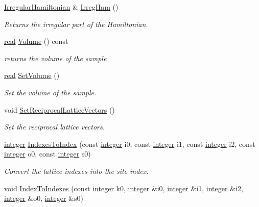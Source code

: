 \begin{DoxyCompactItemize}
\hyperlink{classIrregularHamiltonian}{Irregular\+Hamiltonian} \& \hyperlink{classNumCal_1_1Lattice_a2d7c6553ec30511cb0e17d64beed0424}{Irreg\+Ham} ()
\begin{DoxyCompactList}\small\item\em Returns the irregular part of the Hamiltonian. \end{DoxyCompactList}\item 
\hyperlink{namespaceNumCal_ac10564761316cff6fb75fe8bfccd6def}{real} \hyperlink{classNumCal_1_1Lattice_a8223586b6d642d4436babb7c89f8d424}{Volume} () const 
\begin{DoxyCompactList}\small\item\em returns the volume of the sample \end{DoxyCompactList}\item 
\hyperlink{namespaceNumCal_ac10564761316cff6fb75fe8bfccd6def}{real} \hyperlink{classNumCal_1_1Lattice_a080294bd34727c5e4e536000cc379f01}{Set\+Volume} ()
\begin{DoxyCompactList}\small\item\em Set the volume of the sample. \end{DoxyCompactList}\item 
void \hyperlink{classNumCal_1_1Lattice_aaf21bd2f08683035f260ea4de09b4504}{Set\+Reciprocal\+Lattice\+Vectors} ()
\begin{DoxyCompactList}\small\item\em Set the reciprocal lattice vectors. \end{DoxyCompactList}\item 
\hyperlink{namespaceNumCal_ae1031b42812e871d8f5bd9b7b15fc7d8}{integer} \hyperlink{classNumCal_1_1Lattice_a94dd319f6adc6e820a5696c504216501}{Indexes\+To\+Index} (const \hyperlink{namespaceNumCal_ae1031b42812e871d8f5bd9b7b15fc7d8}{integer} i0, const \hyperlink{namespaceNumCal_ae1031b42812e871d8f5bd9b7b15fc7d8}{integer} i1, const \hyperlink{namespaceNumCal_ae1031b42812e871d8f5bd9b7b15fc7d8}{integer} i2, const \hyperlink{namespaceNumCal_ae1031b42812e871d8f5bd9b7b15fc7d8}{integer} o0, const \hyperlink{namespaceNumCal_ae1031b42812e871d8f5bd9b7b15fc7d8}{integer} s0)
\begin{DoxyCompactList}\small\item\em Convert the lattice indexes into the site index. \end{DoxyCompactList}\item 
void \hyperlink{classNumCal_1_1Lattice_ae39ddbe109d0e01e9c087a4e7accd0b7}{Index\+To\+Indexes} (const \hyperlink{namespaceNumCal_ae1031b42812e871d8f5bd9b7b15fc7d8}{integer} k0, \hyperlink{namespaceNumCal_ae1031b42812e871d8f5bd9b7b15fc7d8}{integer} \&i0, \hyperlink{namespaceNumCal_ae1031b42812e871d8f5bd9b7b15fc7d8}{integer} \&i1, \hyperlink{namespaceNumCal_ae1031b42812e871d8f5bd9b7b15fc7d8}{integer} \&i2, \hyperlink{namespaceNumCal_ae1031b42812e871d8f5bd9b7b15fc7d8}{integer} \&o0, \hyperlink{namespaceNumCal_ae1031b42812e871d8f5bd9b7b15fc7d8}{integer} \&s0)

\end{DoxyCompactItemize}
